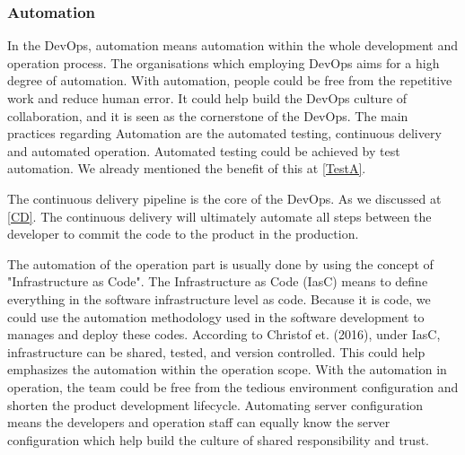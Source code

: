 \subsubsection[]{Automation}
In the DevOps, automation means 
automation within the whole development and operation process. The organisations which employing DevOps aims for a high degree of automation.\cite{erich2017qualitative} 
With automation, people could be free from the repetitive work and reduce human error. It could help build the DevOps culture of collaboration, and it is seen as the cornerstone of the DevOps.\cite{DevOpsCu76:online}
The main practices regarding Automation are the automated testing, continuous delivery and automated operation. Automated testing could be achieved by test automation. We already mentioned the benefit of this at \ref{TestA}.
\par
The continuous delivery pipeline is the core of the DevOps.\cite{gill2018devops} As we discussed at \ref{CD}. The continuous delivery will ultimately automate all steps between the developer to commit the code to the product in the production.
\par
The automation of the operation part is usually done by using the concept of "Infrastructure as Code"\cite{lwakatare2015dimensions}. The Infrastructure as Code (IasC) means to define everything in the software infrastructure level as code.\cite{artac2017devops} Because it is code, we could use the automation methodology used in the software development to manages and deploy these codes. According to Christof et. (2016), under IasC, infrastructure can be shared, tested, and version controlled. \cite{ebert2016devops} This could help emphasizes the automation within the operation scope. With the automation in operation, the team could be free from the tedious environment configuration and shorten the product development lifecycle. Automating server configuration means the developers and operation staff can equally know the server configuration \cite{DevOpsCu76:online} which help build the culture of shared responsibility and trust.
